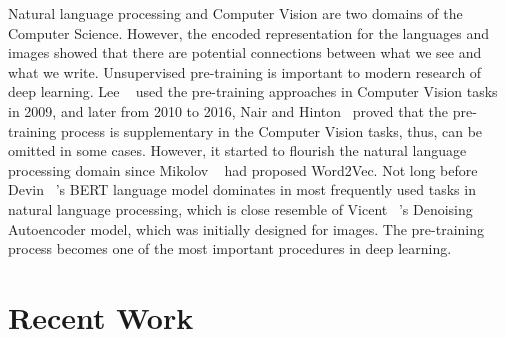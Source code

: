 \documentclass[review]{cvpr}
\begin{document}
  Natural language processing and Computer Vision are two domains of the Computer Science.
  However, the encoded representation for the languages and images showed that there are potential connections between what we see and what we write.
  Unsupervised pre-training is important to modern research of deep learning.
  Lee \etal~\cite{lee2009convolutional} used the pre-training approaches
  in Computer Vision tasks in 2009, and later from 2010 to 2016,
  Nair and Hinton~\cite{nair2010rectified} proved that the pre-training process is supplementary in the Computer Vision tasks,
  thus, can be omitted in some cases.
  However, it started to flourish the natural language processing domain since Mikolov \etal~\cite{mikolov2013distributed} had proposed Word2Vec.
  Not long before Devin \etal~\cite{devlin2019bert}'s BERT language model dominates in most frequently used tasks in natural language processing,
  which is close resemble of Vicent \etal~\cite{vincent2008extracting}'s Denoising Autoencoder model, which was initially designed for images.
  The pre-training process becomes one of the most important procedures in deep learning.


\section{Recent Work}
\end{document}
